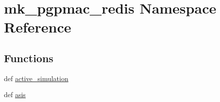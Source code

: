 \hypertarget{namespacemk__pgpmac__redis}{\section{mk\-\_\-pgpmac\-\_\-redis Namespace Reference}
\label{namespacemk__pgpmac__redis}
}
\subsection*{Functions}
\begin{DoxyCompactItemize}
\item 
def \hyperlink{namespacemk__pgpmac__redis_a2572732af48007dc8f70e12ed2a738fe}{active\-\_\-simulation}
\item 
def \hyperlink{namespacemk__pgpmac__redis_afe77e7198e6992a85f09dc3667d931d7}{asis}
\end{DoxyCompactItemize}
